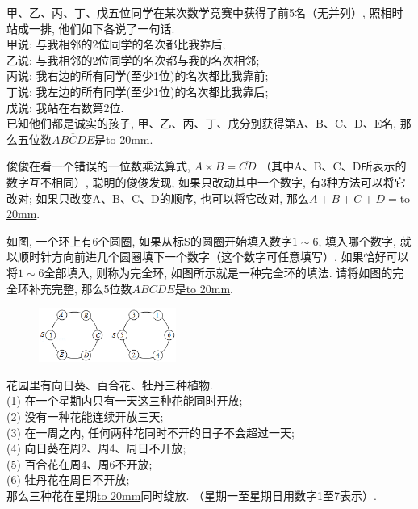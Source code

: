 \item {
    甲、乙、丙、丁、戊五位同学在某次数学竞赛中获得了前5名（无并列）, 照相时站成一排, 他们如下各说了一句话. \\
    甲说: 与我相邻的2位同学的名次都比我靠后; \\
    乙说: 与我相邻的2位同学的名次都与我的名次相邻; \\
    丙说: 我右边的所有同学(至少1位)的名次都比我靠前; \\
    丁说: 我左边的所有同学(至少1位)的名次都比我靠后; \\
    戊说: 我站在右数第2位. \\
    已知他们都是诚实的孩子, 甲、乙、丙、丁、戊分别获得第A、B、C、D、E名, 那么五位数$\overline{ABCDE}$是\underline{\hbox to 20mm{}}.
    \vspace{1cm}
}

\item {
    俊俊在看一个错误的一位数乘法算式, $A\times B=\overline{CD}$ （其中A、B、C、D所表示的数字互不相同）, 聪明的俊俊发现, 如果只改动其中一个数字, 有3种方法可以将它改对; 如果只改变A、B、C、D的顺序, 也可以将它改对, 那么$A+B+C+D=$\underline{\hbox to 20mm{}}.
    \vspace{1cm}
}

\item {
    如图, 一个环上有6个圆圈, 如果从标S的圆圈开始填入数字$1\sim 6$, 填入哪个数字, 就以顺时针方向前进几个圆圈填下一个数字（这个数字可任意填写）, 如果恰好可以将$1\sim 6$全部填入, 则称为完全环, 如图所示就是一种完全环的填法. 请将如图的完全环补充完整, 那么5位数$ABCDE$是\underline{\hbox to 20mm{}}.
    \begin{figure}[H]
        \centering
        \includegraphics[width=0.4\textwidth]{./pics/Chapter_5/2016_3.png}
    \end{figure}
    \vspace{1cm}
}

\item {
    花园里有向日葵、百合花、牡丹三种植物. \\
    (1) 在一个星期内只有一天这三种花能同时开放; \\
    (2) 没有一种花能连续开放三天; \\
    (3) 在一周之内, 任何两种花同时不开的日子不会超过一天; \\
    (4) 向日葵在周2、周4、周日不开放; \\
    (5) 百合花在周4、周6不开放; \\
    (6) 牡丹花在周日不开放; \\
    那么三种花在星期\underline{\hbox to 20mm{}}同时绽放. （星期一至星期日用数字1至7表示）. 
    \vspace{1cm}
}

